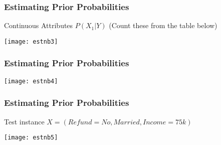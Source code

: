 \begin{frame}[fragile]\frametitle{Estimating Prior Probabilities }
Continuous Attributes $P(X_1|Y)$ (Count these from the table below)
\begin{center}
\texttt{[image: estnb3]}
\end{center}
\end{frame}

\begin{frame}[fragile]\frametitle{Estimating Prior Probabilities }
\begin{center}
\texttt{[image: estnb4]}
\end{center}
\end{frame}


\begin{frame}[fragile]\frametitle{Estimating Prior Probabilities }
Test instance $X = (Refund = No, Married, Income = 75k)$
\begin{center}
\texttt{[image: estnb5]}
\end{center}
\end{frame}



